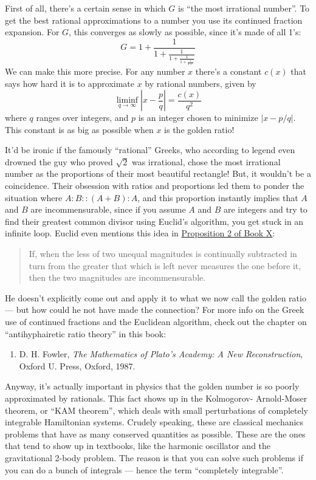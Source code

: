 \documentclass{article}
\def\tightlist{}
\begin{document}
First of all, there's a certain sense in which \(G\) is ``the most
irrational number''. To get the best rational approximations to a number
you use its continued fraction expansion. For \(G\), this converges as
slowly as possible, since it's made of all 1's:
\[G = 1 + \frac{1}{1 + \frac{1}{1 + \frac{1}{1 + \frac{1}{1 + }}}}\] We
can make this more precise. For any number \(x\) there's a constant
\(c(x)\) that says how hard it is to approximate \(x\) by rational
numbers, given by
\[\liminf_{q\to\infty}\left\vert x-\frac{p}{q}\right\vert = \frac{c(x)}{q^2}\]
where \(q\) ranges over integers, and \(p\) is an integer chosen to
minimize \(|x - p/q|\). This constant is as big as possible when \(x\)
is the golden ratio!

It'd be ironic if the famously ``rational'' Greeks, who according to
legend even drowned the guy who proved \(\sqrt{2}\) was irrational,
chose the most irrational number as the proportions of their most
beautiful rectangle! But, it wouldn't be a coincidence. Their obsession
with ratios and proportions led them to ponder the situation where
\(A:B::(A+B):A\), and this proportion instantly implies that \(A\) and
\(B\) are incommensurable, since if you assume \(A\) and \(B\) are
integers and try to find their greatest common divisor using Euclid's
algorithm, you get stuck in an infinite loop. Euclid even mentions this
idea in
\href{http://aleph0.clarku.edu/~djoyce/java/elements/bookX/propX2.html}{Proposition
2 of Book X}:

\begin{quote}
If, when the less of two unequal magnitudes is continually subtracted in
turn from the greater that which is left never measures the one before
it, then the two magnitudes are incommensurable.
\end{quote}

He doesn't explicitly come out and apply it to what we now call the
golden ratio --- but how could he not have made the connection? For more
info on the Greek use of continued fractions and the Euclidean
algorithm, check out the chapter on ``antihyphairetic ratio theory'' in
this book:

\begin{enumerate}
\def\labelenumi{\arabic{enumi})}
\setcounter{enumi}{5}
\tightlist
\item
  D. H. Fowler, \emph{The Mathematics of Plato's Academy: A New
  Reconstruction}, Oxford U. Press, Oxford, 1987.
\end{enumerate}

Anyway, it's actually important in physics that the golden number is so
poorly approximated by rationals. This fact shows up in the Kolmogorov-
Arnold-Moser theorem, or ``KAM theorem'', which deals with small
perturbations of completely integrable Hamiltonian systems. Crudely
speaking, these are classical mechanics problems that have as many
conserved quantities as possible. These are the ones that tend to show
up in textbooks, like the harmonic oscillator and the gravitational
2-body problem. The reason is that you can solve such problems if you
can do a bunch of integrals --- hence the term ``completely
integrable''.
\end{document}
